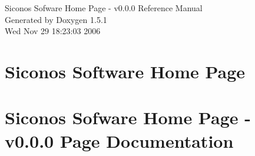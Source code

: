 \documentclass[a4paper]{book}
\begin{document}
\begin{titlepage}
\vspace*{7cm}
\begin{center}
{\Large Siconos Sofware Home Page - v0.0.0 Reference Manual}\\
\vspace*{1cm}
{\large Generated by Doxygen 1.5.1}\\
\vspace*{0.5cm}
{\small Wed Nov 29 18:23:03 2006}\\
\end{center}
\end{titlepage}
\clearemptydoublepage
{}
\tableofcontents
\clearemptydoublepage
{}
\chapter{Siconos Software Home Page }
\label{index}\hypertarget{index}{}
\chapter{Siconos Sofware Home Page - v0.0.0 Page Documentation}




\printindex
\end{document}
